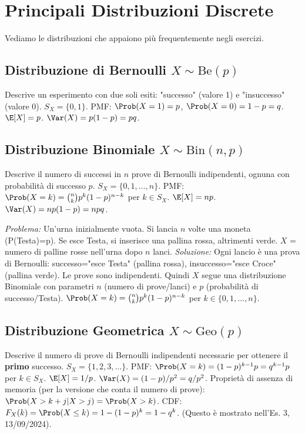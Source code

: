 \section{Principali Distribuzioni Discrete}
Vediamo le distribuzioni che appaiono più frequentemente negli esercizi.

\subsection{Distribuzione di Bernoulli \texorpdfstring{$X \sim \text{Be}(p)$}{X ~ Be(p)}}
Descrive un esperimento con due soli esiti: "successo" (valore 1) e "insuccesso" (valore 0).
$S_X = \{0, 1\}$.
PMF: $\Prob(X=1) = p$, $\Prob(X=0) = 1-p = q$.
$\E[X] = p$.
$\Var(X) = p(1-p) = pq$.

\subsection{Distribuzione Binomiale \texorpdfstring{$X \sim \text{Bin}(n,p)$}{X ~ Bin(n,p)}}
Descrive il numero di successi in $n$ prove di Bernoulli indipendenti, ognuna con probabilità di successo $p$.
$S_X = \{0, 1, \dots, n\}$.
PMF: $\Prob(X=k) = \binom{n}{k} p^k (1-p)^{n-k}$ per $k \in S_X$.
$\E[X] = np$.
$\Var(X) = np(1-p) = npq$.
\begin{example}
\textit{Problema:} Un'urna inizialmente vuota. Si lancia $n$ volte una moneta (P(Testa)=p). Se esce Testa, si inserisce una pallina rossa, altrimenti verde. $X$ = numero di palline rosse nell'urna dopo $n$ lanci.
\textit{Soluzione:} Ogni lancio è una prova di Bernoulli: successo="esce Testa" (pallina rossa), insuccesso="esce Croce" (pallina verde). Le prove sono indipendenti.
Quindi $X$ segue una distribuzione Binomiale con parametri $n$ (numero di prove/lanci) e $p$ (probabilità di successo/Testa).
$\Prob(X=k) = \binom{n}{k} p^k (1-p)^{n-k}$ per $k \in \{0, 1, \dots, n\}$.
\end{example}

\subsection{Distribuzione Geometrica \texorpdfstring{$X \sim \text{Geo}(p)$}{X ~ Geo(p)}}
Descrive il numero di prove di Bernoulli indipendenti necessarie per ottenere il \textbf{primo} successo.
$S_X = \{1, 2, 3, \dots\}$.
PMF: $\Prob(X=k) = (1-p)^{k-1} p = q^{k-1}p$ per $k \in S_X$.
$\E[X] = 1/p$.
$\Var(X) = (1-p)/p^2 = q/p^2$.
Proprietà di assenza di memoria (per la versione che conta il numero di prove):
$\Prob(X > k+j | X > j) = \Prob(X > k)$.
CDF: $F_X(k) = \Prob(X \le k) = 1 - (1-p)^k = 1 - q^k$. (Questo è mostrato nell'Es. 3, 13/09/2024).

